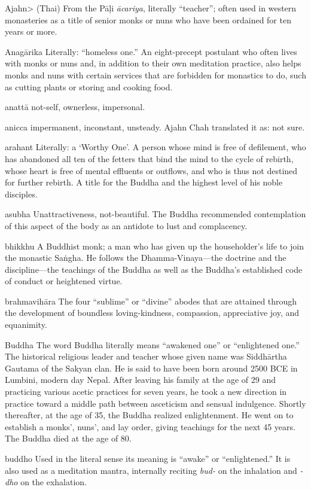 Ajahn> (Thai) From the Pāḷi \emph{ācariya}, literally ``teacher''; 
often used in western monasteries as a title of senior monks or nuns 
who have been ordained for ten years or more.

Anagārika Literally: ``homeless one.'' An eight-precept postulant who 
often lives with monks or nuns and, in addition to their own meditation 
practice, also helps monks and nuns with certain services that are 
forbidden for monastics to do, such as cutting plants or storing and 
cooking food.

anattā not-self, ownerless, impersonal.

anicca impermanent, inconstant, unsteady. Ajahn Chah translated it as: 
not sure.

arahant Literally: a `Worthy One'. A person whose mind is free of 
defilement, who has abandoned all ten of the fetters that bind the mind 
to the cycle of rebirth, whose heart is free of mental effluents or 
outflows, and who is thus not destined for further rebirth. A title for 
the Buddha and the highest level of his noble disciples.

asubha Unattractiveness, not-beautiful. The Buddha recommended 
contemplation of this aspect of the body as an antidote to lust and 
complacency.

bhikkhu A Buddhist monk; a man who has given up the householder's life 
to join the monastic Saṅgha. He follows the Dhamma-Vinaya---the 
doctrine and the discipline---the teachings of the Buddha as well as 
the Buddha's established code of conduct or heightened virtue.

brahmavihāra The four ``sublime'' or ``divine'' abodes that are 
attained through the development of boundless loving-kindness, 
compassion, appreciative joy, and equanimity.

Buddha The word Buddha literally means ``awakened one'' or 
``enlightened one.'' The historical religious leader and teacher whose 
given name was Siddhārtha Gautama of the Sakyan clan. He is said to 
have been born around 2500 BCE in Lumbini, modern day Nepal. After 
leaving his family at the age of 29 and practicing various acetic 
practices for seven years, he took a new direction in practice toward a 
middle path between asceticism and sensual indulgence. Shortly 
thereafter, at the age of 35, the Buddha realized enlightenment. He 
went on to establish a monks', nuns', and lay order, giving teachings 
for the next 45 years. The Buddha died at the age of 80.

buddho Used in the literal sense its meaning is ``awake'' or 
``enlightened.'' It is also used as a meditation mantra, internally 
reciting \emph{bud-} on the inhalation and \emph{-dho} on the 
exhalation.

